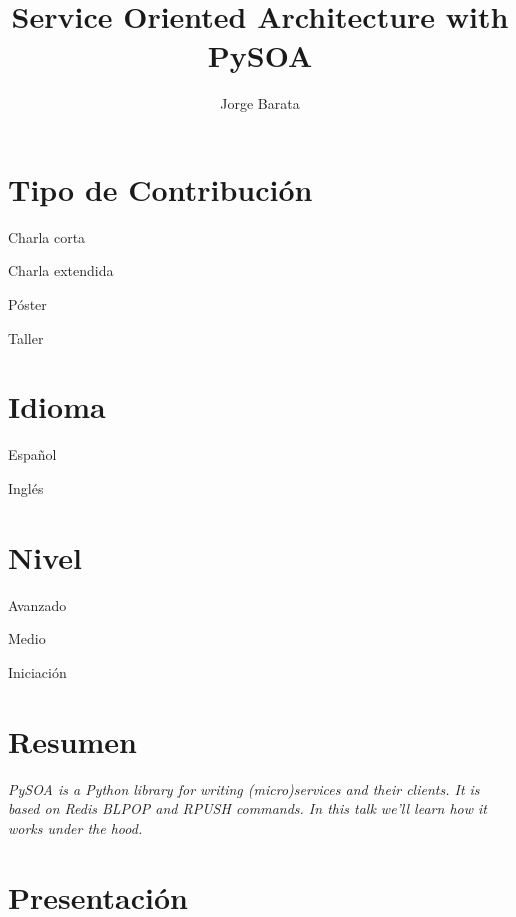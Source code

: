 \documentclass[runningheads]{llncs}
\newcommand{\cmark}{\ding{51}}%
\newcommand{\done}{\rlap{$\square$}{\raisebox{2pt}{\large\hspace{1pt}\cmark}}%
\hspace{-2.5pt}}
\begin{document}
\pagestyle{headings}
\mainmatter


\title{Service Oriented Architecture with PySOA}


\author{Jorge Barata}

\maketitle

\section{Tipo de Contribuci\'on}

\begin{todolist}
  \item [\done] Charla corta
  \item Charla extendida
  \item P\'oster
  \item Taller
  \end{todolist}


\section{Idioma}
\begin{todolist}
  \item Espa\~nol
  \item [\done] Ingl\'es
\end{todolist}
\section{Nivel}

\begin{todolist}
  \item Avanzado
  \item [\done] Medio
  \item Iniciaci\'on
  \end{todolist}


\newpage

\section{Resumen}
\textit{
PySOA is a Python library for writing (micro)services and their clients. It is based on Redis BLPOP and RPUSH commands. In this talk we’ll learn how it works under the hood.
}

\section{Presentaci\'on}
\end{document}
